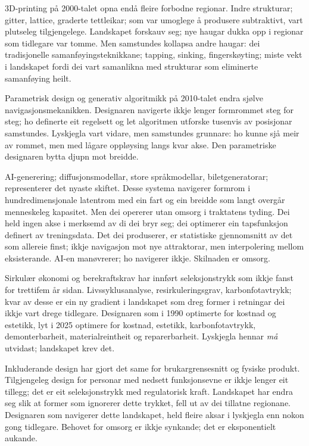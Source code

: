 3D-printing på 2000-talet opna endå fleire forbodne regionar. Indre strukturar; gitter, lattice, graderte tettleikar; som var umoglege å produsere subtraktivt, vart plutseleg tilgjengelege. Landskapet forskauv seg; nye haugar dukka opp i regionar som tidlegare var tomme. Men samstundes kollapsa andre haugar: dei tradisjonelle samanføyingsteknikkane; tapping, sinking, fingerskøyting; miste vekt i landskapet fordi dei vart samanlikna med strukturar som eliminerte samanføying heilt.

Parametrisk design og generativ algoritmikk på 2010-talet endra sjølve navigasjonsmekanikken. Designaren navigerte ikkje lenger formrommet steg for steg; ho definerte eit regelsett og let algoritmen utforske tusenvis av posisjonar samstundes. Lyskjegla vart vidare, men samstundes grunnare: ho kunne sjå meir av rommet, men med lågare oppløysing langs kvar akse. Den parametriske designaren bytta djupn mot breidde.

AI-generering; diffusjonsmodellar, store språkmodellar, biletgeneratorar; representerer det nyaste skiftet. Desse systema navigerer formrom i hundredimensjonale latentrom med ein fart og ein breidde som langt overgår menneskeleg kapasitet. Men dei opererer utan omsorg i traktatens tyding. Dei held ingen akse i merksemd av di dei bryr seg; dei optimerer ein tapsfunksjon definert av treningsdata. Det dei produserer, er statistiske gjennomsnitt av det som allereie finst; ikkje navigasjon mot nye attraktorar, men interpolering mellom eksisterande. AI-en manøvrerer; ho navigerer ikkje. Skilnaden er omsorg.

Sirkulær økonomi og berekraftskrav har innført seleksjonstrykk som ikkje fanst for trettifem år sidan. Livssyklusanalyse, resirkuleringsgrav, karbonfotavtrykk; kvar av desse er ein ny gradient i landskapet som dreg former i retningar dei ikkje vart drege tidlegare. Designaren som i 1990 optimerte for kostnad og estetikk, lyt i 2025 optimere for kostnad, estetikk, karbonfotavtrykk, demonterbarheit, materialreintheit og reparerbarheit. Lyskjegla hennar \textit{må} utvidast; landskapet krev det.

Inkluderande design har gjort det same for brukargrensesnitt og fysiske produkt. Tilgjengeleg design for personar med nedsett funksjonsevne er ikkje lenger eit tillegg; det er eit seleksjonstrykk med regulatorisk kraft. Landskapet har endra seg slik at former som ignorerer dette trykket, fell ut av dei tillatne regionane. Designaren som navigerer dette landskapet, held fleire aksar i lyskjegla enn nokon gong tidlegare. Behovet for omsorg er ikkje synkande; det er eksponentielt aukande.

